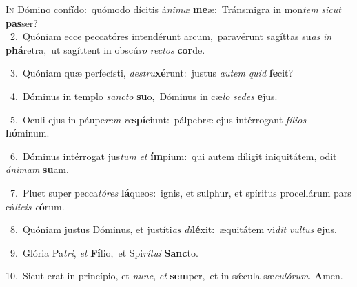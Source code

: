 \lettrine{\initial\textcolor{\initialcolor}{I}}{n} Dómino confído:~\dagger quómodo dícitis á\-\textit{ni}\-\textit{mæ} \textbf{me}\-æ:~\star Tránsmigra in mon\textit{tem} \textit{sic}\-\textit{ut} \textbf{pas}\-ser?\\
{\numbfont\textcolor{\numbcolor}{~2.}}~Quóniam ecce peccatóres intendérunt arcum,~\dagger paravérunt sagíttas su\textit{as} \textit{in} \textbf{phá}\-retra,~\star ut sagíttent in obscú\textit{ro} \textit{rec}\-\textit{tos} \textbf{cor}\-de.\par
{\numbfont\textcolor{\numbcolor}{~3.}}~Quóniam quæ perfecísti, \textit{de}\-\textit{stru}\textbf{xé}runt:~\star justus \textit{au}\-\textit{tem} \textit{quid} \textbf{fe}\-cit?\par
{\numbfont\textcolor{\numbcolor}{~4.}}~Dóminus in templo \textit{sanc}\-\textit{to} \textbf{su}\-o,~\star Dóminus in cæ\textit{lo} \textit{se}\-\textit{des} \textbf{e}\-jus.\par
{\numbfont\textcolor{\numbcolor}{~5.}}~Oculi ejus in páupe\textit{rem} \textit{re}\-\textbf{spí}ciunt:~\star pálpebræ ejus intérrogant \textit{fí}\-\textit{li}\textit{os} \textbf{hó}\-minum.\par
{\numbfont\textcolor{\numbcolor}{~6.}}~Dóminus intérrogat jus\textit{tum} \textit{et} \textbf{ím}\-pium:~\star qui autem díligit iniquitátem, odit \textit{á}\-\textit{ni}\textit{mam} \textbf{su}\-am.\par
{\numbfont\textcolor{\numbcolor}{~7.}}~Pluet super pecca\-\textit{tó}\-\textit{res} \textbf{lá}\-queos:~\star ignis, et sulphur, et spíritus procellárum pars cá\-\textit{li}\-\textit{cis} \textit{e}\-\textbf{ó}rum.\par
{\numbfont\textcolor{\numbcolor}{~8.}}~Quóniam justus Dóminus, et justíti\textit{as} \textit{di}\-\textbf{lé}xit:~\star æquitátem vi\textit{dit} \textit{vul}\-\textit{tus} \textbf{e}\-jus.\par
{\numbfont\textcolor{\numbcolor}{~9.}}~Glória Pa\-\textit{tri}\-, \textit{et} \textbf{Fí}\-lio,~\star et Spi\-\textit{rí}\-\textit{tu}\textit{i} \textbf{Sanc}\-to.\par
{\numbfont\textcolor{\numbcolor}{10.}}~Sicut erat in princípio, et \textit{nunc}\-, \textit{et} \textbf{sem}\-per,~\star et in sǽcula sæ\-\textit{cu}\-\textit{ló}\textit{rum}. \textbf{A}\-men.\par
